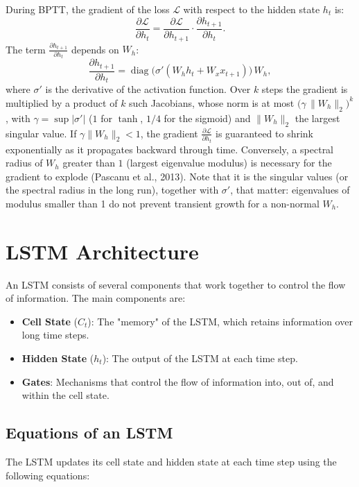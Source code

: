 \begin{notechapter}
During BPTT, the gradient of the loss \(\mathcal{L}\) with respect
to the hidden state \(h_t\) is:
\[
\frac{\partial \mathcal{L}}{\partial h_t} = \frac{\partial \mathcal{L}}{\partial h_{t+1}} \cdot \frac{\partial h_{t+1}}{\partial h_t}.
\]
The term \(\frac{\partial h_{t+1}}{\partial h_t}\) depends on \(W_h\):
\[
\frac{\partial h_{t+1}}{\partial h_t} = \operatorname{diag}\big(\sigma'(W_h h_t + W_x x_{t+1})\big) \, W_h,
\]
where \(\sigma'\) is the derivative of the activation function. Over \(k\) steps the gradient is
multiplied by a product of \(k\) such Jacobians, whose norm is at most
\(\big(\gamma\,\|W_h\|_2\big)^k\), with \(\gamma = \sup|\sigma'|\) (\(1\) for \(\tanh\), \(1/4\) for the sigmoid)
and \(\|W_h\|_2\) the largest singular value. If \(\gamma\|W_h\|_2 < 1\), the gradient
\(\frac{\partial \mathcal{L}}{\partial h_t}\) is guaranteed to shrink exponentially
as it propagates backward through time. Conversely, a spectral radius of \(W_h\) greater than \(1\)
(largest eigenvalue modulus) is necessary for the gradient to explode (Pascanu et al., 2013). Note that it is the
singular values (or the spectral radius in the long run), together with \(\sigma'\), that matter: eigenvalues of
modulus smaller than 1 do not prevent transient growth for a non-normal \(W_h\).

\section{LSTM Architecture}
An LSTM consists of several components that work together to control
the flow of information. The main components are:
\begin{itemize}
    \item \textbf{Cell State} (\(C_t\)): The "memory" of the LSTM,
    which retains information over long time steps.
    \item \textbf{Hidden State} (\(h_t\)): The output of the LSTM
    at each time step.
    \item \textbf{Gates}: Mechanisms that control the flow of
    information into, out of, and within the cell state.
\end{itemize}

\subsection{Equations of an LSTM}
The LSTM updates its cell state and hidden state at each time step
using the following equations:


\end{notechapter}
